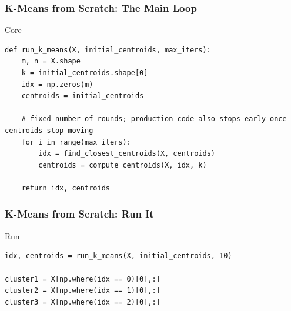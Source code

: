 



\begin{frame}[fragile]\frametitle{K-Means from Scratch: The Main Loop}
Core
\begin{lstlisting}
def run_k_means(X, initial_centroids, max_iters):
    m, n = X.shape
    k = initial_centroids.shape[0]
    idx = np.zeros(m)
    centroids = initial_centroids

    # fixed number of rounds; production code also stops early once centroids stop moving
    for i in range(max_iters):
        idx = find_closest_centroids(X, centroids)
        centroids = compute_centroids(X, idx, k)
    
    return idx, centroids
\end{lstlisting}
\end{frame}

\begin{frame}[fragile]\frametitle{K-Means from Scratch: Run It}
Run
\begin{lstlisting}
idx, centroids = run_k_means(X, initial_centroids, 10)

cluster1 = X[np.where(idx == 0)[0],:]
cluster2 = X[np.where(idx == 1)[0],:]
cluster3 = X[np.where(idx == 2)[0],:]
\end{lstlisting}
\end{frame}

